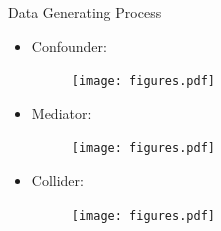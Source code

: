 \documentclass[aspectratio=169]{beamer}
\begin{document}
\begin{frame}{Data Generating Process}
	\begin{itemize}
		\item Confounder:  \begin{figure} \texttt{[image: figures.pdf]}\end{figure}
		\item Mediator: \begin{figure} \texttt{[image: figures.pdf]} \end{figure}
		\item Collider: \begin{figure} \texttt{[image: figures.pdf]} \end{figure}
	\end{itemize}
\end{frame}
\end{document}

